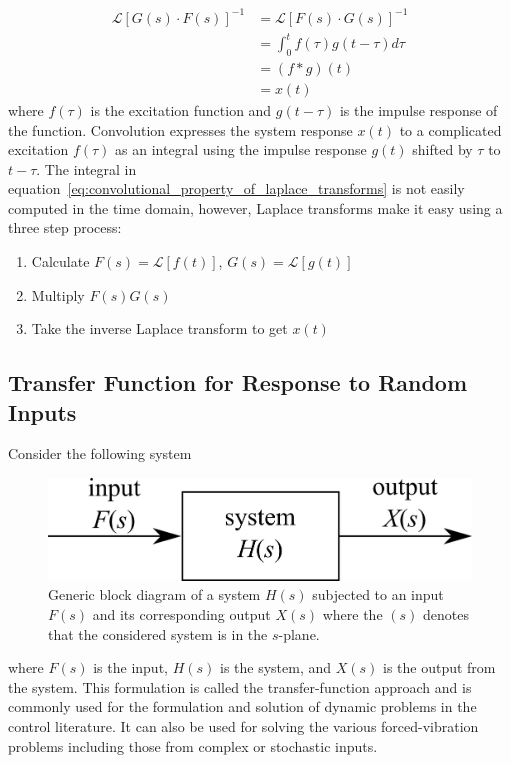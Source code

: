 \documentclass[12pt,letter]{article}
\numberwithin{ex}{section} %
\numberwithin{re}{section} %
\newcommand{\Laplace}[1]{\ensuremath{\mathcal{L}{\left[#1\right]}}}
\numberwithin{equation}{section}	%
\begin{document}
\begin{align}
\label{eq:convolutional_property_of_laplace_transforms}
\Laplace{G(s) \cdot F(s)}^{-1} &= \Laplace{F(s) \cdot G(s)}^{-1} \\
&= \int_0^t f(\tau) g(t-\tau) d \tau \nonumber \\
&= (f * g)(t)  \nonumber \\ 
&= x(t) \nonumber
\end{align}
where $f(\tau)$ is the excitation function and $g(t-\tau)$ is the impulse response of the function. Convolution expresses the system response $x(t)$ to a complicated excitation $f(\tau)$ as an integral using the impulse response $g(t)$  shifted by $\tau$ to $t-\tau$. 
The integral in equation~\ref{eq:convolutional_property_of_laplace_transforms} is not easily computed in the time domain, however, Laplace transforms make it easy using a three step process:
\begin{enumerate}[noitemsep,topsep=0pt]
\item Calculate $F(s) = \Laplace{f(t)} $, $G(s) = \Laplace{g(t)}$
\item Multiply $F(s)G(s)$
\item Take the inverse Laplace transform to get $x(t)$
\end{enumerate} 

\subsection{Transfer Function for Response to Random Inputs}

			Consider the following system
			\begin{figure}[H]
				\centering
				\includegraphics[]{../figures/transfer_function_system.png}
				\caption{Generic block diagram of a system $H(s)$ subjected to an input $F(s)$ and its corresponding output $X(s)$ where the $(s)$ denotes that the considered system is in the $s$-plane.}
				\label{fig:transfer_function_system}
			\end{figure}
			\noindent where $F(s)$ is the input, $H(s)$ is the system, and $X(s)$ is the output from the system. This formulation is called the transfer-function approach and is commonly used for the formulation and solution of dynamic problems in the control literature. It can also be used for solving the various forced-vibration problems including those from complex or stochastic inputs. 
	
\end{document}

